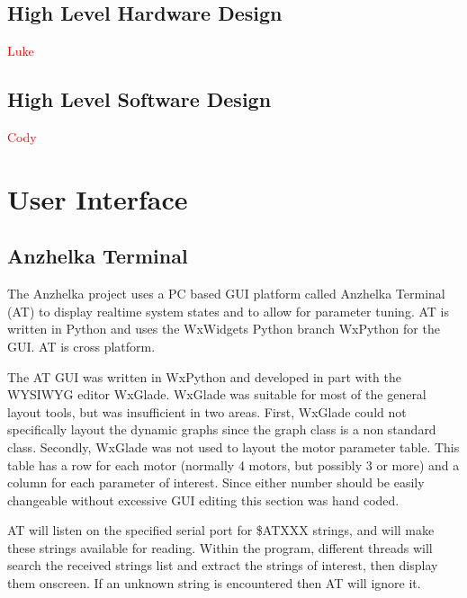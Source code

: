 \documentclass{article}
\numberwithin{equation}{section} %
\begin{document}

\subsection{High Level Hardware Design}
\textcolor{red}{Luke}

\subsection{High Level Software Design}
\textcolor{red}{Cody}

 
\section{User Interface}

\subsection{Anzhelka Terminal}
The Anzhelka project uses a PC based GUI platform called Anzhelka Terminal (AT) to display realtime system states and to allow for parameter tuning. AT is written in Python and uses the WxWidgets Python branch WxPython for the GUI. AT is cross platform.

The AT GUI was written in WxPython and developed in part with the WYSIWYG editor WxGlade. WxGlade was suitable for most of the general layout tools, but was insufficient in two areas. First, WxGlade could not specifically layout the dynamic graphs since the graph class is a non standard class. Secondly, WxGlade was not used to layout the motor parameter table. This table has a row for each motor (normally 4 motors, but possibly 3 or more) and a column for each parameter of interest. Since either number should be easily changeable without excessive GUI editing this section was hand coded.

AT will listen on the specified serial port for \$ATXXX strings, and will  make these strings available for reading. Within the program, different threads will search the received strings list and extract the strings of interest, then display them onscreen. If an unknown string is encountered then AT will ignore it.
\end{document}
